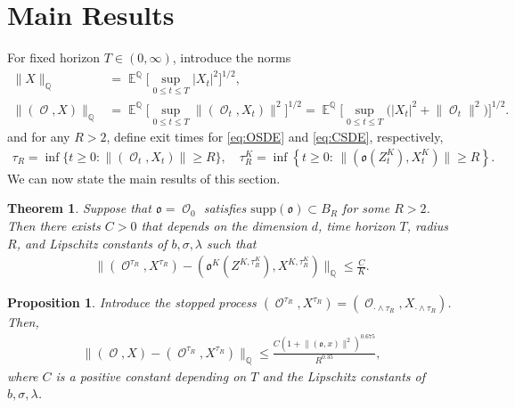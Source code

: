 \documentclass[11pt]{article}
\numberwithin{equation}{section}
\theoremstyle{plain}
\newtheorem{theorem}{Theorem}[section]
\newtheorem{proposition}{Proposition}[section]
\theoremstyle{definition}
\DeclareMathOperator{\E}{\mathbb{E}}
\DeclareMathOperator{\Q}{\mathbb{Q}}
\DeclareMathOperator{\calO}{\mathcal{O}}
\def\mo{\mathfrak{o}}
\begin{document}
%

\section{Main Results} \label{sec:convergence} 
For fixed horizon $T\in (0,\infty)$,  introduce the norms 
\begin{align}
            \lVert X\rVert_{\Q} &= \E^{\Q}\Big[ \sup_{0 \leq t \leq T} |X_t|^2\Big]^{1/2}, \label{eq:normX} \\[0.5em]
              \lVert (\calO,X)\rVert_{\Q} &=\E^{\Q}\Big[ \sup_{0 \leq t \leq T} \lVert(\calO_t,X_t) \rVert^2 \Big]^{1/2} = \E^{\Q}\Big[ \sup_{0 \leq t \leq T} \big( |X_t|^2 + \lVert \calO_t\rVert^2 \big)\Big]^{1/2}.  
\end{align}
and for any $R > 2$, define exit times for \eqref{eq:OSDE} and \eqref{eq:CSDE}, respectively, 
\begin{align}\label{eq:exitTime}
    \tau_{R}=\inf\{ t \geq 0: \lVert(\calO_t,X_t) \rVert \geq R \}, \quad 
    \tau_R^K=\inf\left\{ t \geq 0: \, \lVert (\mo(Z_t^K),X^K_t) \rVert \geq R  \right\}. 
\end{align}
We can now state the main results  of this section.

\begin{theorem}\label{thm:convergence}
Suppose that $\mo = \calO_0$ satisfies $\text{supp}(\mo) \subset B_R$ for some $R>2$. Then there exists $C>0$ that depends on the dimension $d$, time horizon $T$, radius $R$, and Lipschitz constants  of $b,\sigma, \lambda$ such that
    \begin{align}\label{eq:truncationerror}
        \lVert (\calO^{\tau_R},X^{\tau_R})-( \mo^K(Z^{K,\tau^K_R}) ,X^{K,\tau^K_R}) \rVert_{\Q} \leq \frac{C}{K}.
    \end{align}
\end{theorem}


\begin{proposition}\label{prop:exitbound}
Introduce the stopped process $(\calO^{\tau_R},X^{\tau_R}) = (\calO_{\cdot\wedge \tau_R},X_{\cdot \wedge \tau_R})$.
Then, 
\begin{align*}
    \lVert (\calO,X)-(\calO^{\tau_R},X^{\tau_R}) \rVert_{\Q}  \leq  \frac{C (1+\lVert(\mo,x) \rVert^2)^{0.675}}{R^{0.35}},
\end{align*}
where $C$ is a positive constant depending on $T$ and the Lipschitz constants of $b, \sigma,\lambda$.
\end{proposition}
\end{document}
